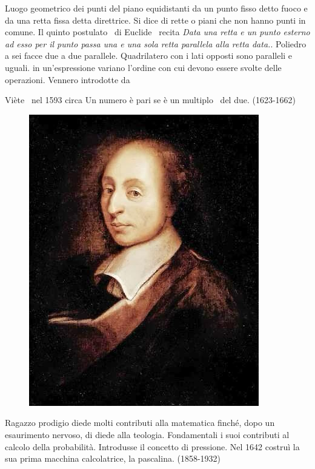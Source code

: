 Luogo geometrico dei punti del piano equidistanti da un punto fisso detto fuoco e da una retta fissa detta direttrice.
 Si dice di rette o piani che non hanno punti in comune.  Il quinto postulato\pointsto~  di Euclide\pointsto~ recita  \textit{Data una retta e un punto esterno ad esso per il punto passa una e una sola retta parallela alla retta data.}. 
 Poliedro a sei facce due a due parallele.
 Quadrilatero con i lati opposti sono paralleli e uguali.
 in un'espressione variano l'ordine con cui devono essere svolte delle operazioni. Vennero introdotte da {Viète\pointsto~ nel 1593 circa\cite{Kline1972}
 Un numero è pari se è un multiplo\pointsto~ del due.
 (1623-1662)
\begin{figure}
	\centering{}
	\label{fig:pascalblaise}
	\includegraphics[width=0.7\linewidth]{Figure/P/Pascal_Blaise}
\end{figure}Ragazzo prodigio diede molti contributi alla matematica finché, dopo un esaurimento nervoso, di diede alla teologia. Fondamentali i suoi contributi al calcolo della probabilità. Introdusse il concetto di pressione. Nel 1642 costruì la sua prima macchina calcolatrice, la pascalina.
  (1858-1932)
}
